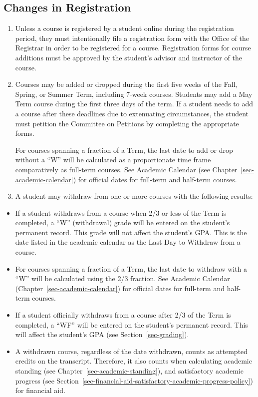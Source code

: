 \documentclass[
  letterpaper,
]{scrbook}
\providecommand{\tightlist}{%
  \setlength{\itemsep}{0pt}\setlength{\parskip}{0pt}}
\begin{document}
\subsection{Changes in Registration}\label{changes-in-registration}

\begin{enumerate}
\def\labelenumi{\arabic{enumi}.}
\item
  Unless a course is registered by a student online during the
  registration period, they must intentionally file a registration form
  with the Office of the Registrar in order to be registered for a
  course. Registration forms for course additions must be approved by
  the student's advisor and instructor of the course.
\item
  Courses may be added or dropped during the first five weeks of the
  Fall, Spring, or Summer Term, including 7-week courses. Students may
  add a May Term course during the first three days of the term. If a
  student needs to add a course after these deadlines due to extenuating
  circumstances, the student must petition the Committee on Petitions by
  completing the appropriate forms.

  For courses spanning a fraction of a Term, the last date to add or
  drop without a ``W'' will be calculated as a proportionate time frame
  comparatively as full-term courses. See Academic Calendar (see
  Chapter~\ref{sec-academic-calendar}) for official dates for full-term
  and half-term courses.
\item
  A student may withdraw from one or more courses with the following
  results:
\end{enumerate}

\begin{itemize}
\tightlist
\item
  If a student withdraws from a course when 2/3 or less of the Term is
  completed, a ``W'' (withdrawal) grade will be entered on the student's
  permanent record. This grade will not affect the student's GPA. This
  is the date listed in the academic calendar as the Last Day to
  Withdraw from a course.\\
\item
  For courses spanning a fraction of a Term, the last date to withdraw
  with a ``W'' will be calculated using the 2/3 fraction. See Academic
  Calendar (Chapter~\ref{sec-academic-calendar}) for official dates for
  full-term and half-term courses.
\item
  If a student officially withdraws from a course after 2/3 of the Term
  is completed, a ``WF'' will be entered on the student's permanent
  record. This will affect the student's GPA (see
  Section~\ref{sec-grading}).
\item
  A withdrawn course, regardless of the date withdrawn, counts as
  attempted credits on the transcript. Therefore, it also counts when
  calculating academic standing (see
  Chapter~\ref{sec-academic-standing}), and satisfactory academic
  progress (see
  Section~\ref{sec-financial-aid-satisfactory-academic-progress-policy})
  for financial aid.
\end{itemize}
\end{document}
